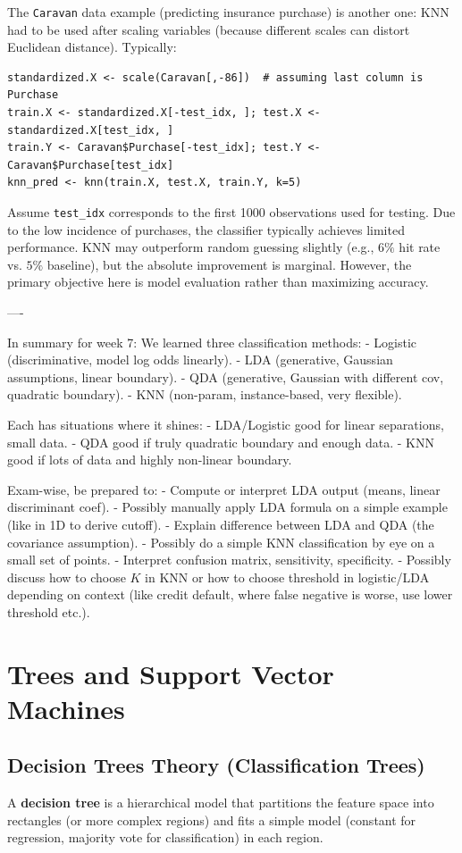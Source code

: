 \documentclass[11pt]{article}
\begin{document}
The \texttt{Caravan} data example (predicting insurance purchase) is another one: KNN had to be used after scaling variables (because different scales can distort Euclidean distance). Typically:
\begin{verbatim}
standardized.X <- scale(Caravan[,-86])  # assuming last column is Purchase
train.X <- standardized.X[-test_idx, ]; test.X <- standardized.X[test_idx, ]
train.Y <- Caravan$Purchase[-test_idx]; test.Y <- Caravan$Purchase[test_idx]
knn_pred <- knn(train.X, test.X, train.Y, k=5)
\end{verbatim}
Assume \texttt{test\_idx} corresponds to the first 1000 observations used for testing. Due to the low incidence of purchases, the classifier typically achieves limited performance. KNN may outperform random guessing slightly (e.g., $6\%$ hit rate vs. $5\%$ baseline), but the absolute improvement is marginal. However, the primary objective here is model evaluation rather than maximizing accuracy.

----

In summary for week 7: We learned three classification methods:
- Logistic (discriminative, model log odds linearly).
- LDA (generative, Gaussian assumptions, linear boundary).
- QDA (generative, Gaussian with different cov, quadratic boundary).
- KNN (non-param, instance-based, very flexible).

Each has situations where it shines:
- LDA/Logistic good for linear separations, small data.
- QDA good if truly quadratic boundary and enough data.
- KNN good if lots of data and highly non-linear boundary.

Exam-wise, be prepared to:
- Compute or interpret LDA output (means, linear discriminant coef).
- Possibly manually apply LDA formula on a simple example (like in 1D to derive cutoff).
- Explain difference between LDA and QDA (the covariance assumption).
- Possibly do a simple KNN classification by eye on a small set of points.
- Interpret confusion matrix, sensitivity, specificity.
- Possibly discuss how to choose $K$ in KNN or how to choose threshold in logistic/LDA depending on context (like credit default, where false negative is worse, use lower threshold etc.).

\section{Trees and Support Vector Machines}

\subsection{Decision Trees Theory (Classification Trees)}
A \textbf{decision tree} is a hierarchical model that partitions the feature space into rectangles (or more complex regions) and fits a simple model (constant for regression, majority vote for classification) in each region. \\
\end{document}
